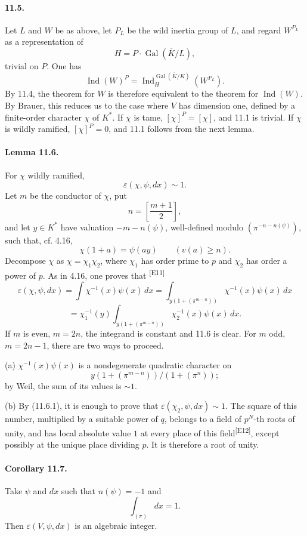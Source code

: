 \documentclass[10pt,letterpaper]{article}
\newcommand{\Gal}{\operatorname{Gal}}
\newcommand{\Ind}{\operatorname{Ind}}
\providecommand{\Gal}{\operatorname{Gal}}
\providecommand{\Gal}{\operatorname{Gal}}
\providecommand{\Gal}{\operatorname{Gal}}
\providecommand{\Gal}{\operatorname{Gal}}
\providecommand{\Ind}{\operatorname{Ind}}
\newcommand{\auditmark}[1]{\textsuperscript{\normalfont\scriptsize[E#1]}}
\begin{document}
\paragraph{11.5.} Let \(L\) and \(W\) be as above, let \(P_L\) be the wild inertia group of \(L\), and regard \(W^{P_L}\) as a representation of
\[
H=P\cdot\Gal(\overline K/L),
\]
trivial on \(P\). One has
\[
\Ind(W)^P=\Ind_H^{\Gal(\overline K/K)}(W^{P_L}).
\]
By 11.4, the theorem for \(W\) is therefore equivalent to the theorem for \(\Ind(W)\). By Brauer, this reduces us to the case where \(V\) has dimension one, defined by a finite-order character \(\chi\) of \(K^*\). If \(\chi\) is tame, \([\chi]^P=[\chi]\), and 11.1 is trivial. If \(\chi\) is wildly ramified, \([\chi]^P=0\), and 11.1 follows from the next lemma.

\paragraph{Lemma 11.6.} For \(\chi\) wildly ramified,
\[
\varepsilon(\chi,\psi,dx)\sim1.
\]
Let \(m\) be the conductor of \(\chi\), put
\[
n=\left[\frac{m+1}{2}\right],
\]
and let \(y\in K^*\) have valuation \(-m-n(\psi)\), well-defined modulo \((\pi^{-n-n(\psi)})\), such that, cf. 4.16,
\[
\chi(1+a)=\psi(ay)\qquad(v(a)\ge n).
\]
Decompose \(\chi\) as \(\chi=\chi_1\chi_2\), where \(\chi_1\) has order prime to \(p\) and \(\chi_2\) has order a power of \(p\). As in 4.16, one proves that
\noindent\auditmark{11}
\[
\tag{11.6.1}
\varepsilon(\chi,\psi,dx)
=
\int \chi^{-1}(x)\psi(x)\,dx
=
\int_{y(1+(\pi^{m-n}))}\chi^{-1}(x)\psi(x)\,dx
\]
\[
=
\chi_1^{-1}(y)
\int_{y(1+(\pi^{m-n}))}\chi_2^{-1}(x)\psi(x)\,dx.
\]
If \(m\) is even, \(m=2n\), the integrand is constant and 11.6 is clear. For \(m\) odd, \(m=2n-1\), there are two ways to proceed.

(a) \(\chi^{-1}(x)\psi(x)\) is a nondegenerate quadratic character on
\[
y(1+(\pi^{m-n}))/(1+(\pi^n));
\]
by Weil, the sum of its values is \(\sim1\).

(b) By (11.6.1), it is enough to prove that \(\varepsilon(\chi_2,\psi,dx)\sim1\). The square of this number, multiplied by a suitable power of \(q\), belongs to a field of \(p^N\)-th roots of unity, and has local absolute value \(1\) at every place of this field\auditmark{12}, except possibly at the unique place dividing \(p\). It is therefore a root of unity.

\paragraph{Corollary 11.7.} Take \(\psi\) and \(dx\) such that \(n(\psi)=-1\) and
\[
\int_{(\pi)}dx=1.
\]
Then \(\varepsilon(V,\psi,dx)\) is an algebraic integer.
\end{document}
